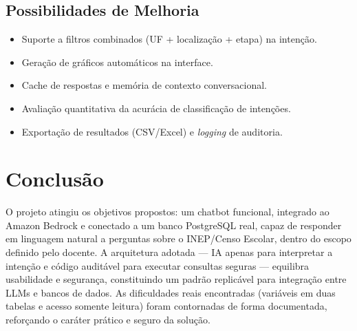 \documentclass[
    12pt,
    oneside,
    a4paper,
    chapter=TITLE,
    section=TITLE
]{abntex2}
\begin{document}
\section{Possibilidades de Melhoria}
\begin{itemize}[itemsep=1pt]
  \item Suporte a filtros combinados (UF + localização + etapa) na intenção.
  \item Geração de gráficos automáticos na interface.
  \item Cache de respostas e memória de contexto conversacional.
  \item Avaliação quantitativa da acurácia de classificação de intenções.
  \item Exportação de resultados (CSV/Excel) e \textit{logging} de auditoria.
\end{itemize}

\chapter{Conclusão}

O projeto atingiu os objetivos propostos: um chatbot funcional, integrado ao Amazon Bedrock e
conectado a um banco PostgreSQL real, capaz de responder em linguagem natural a perguntas sobre o
INEP/Censo Escolar, dentro do escopo definido pelo docente. A arquitetura adotada --- IA apenas para
interpretar a intenção e código auditável para executar consultas seguras --- equilibra usabilidade
e segurança, constituindo um padrão replicável para integração entre LLMs e bancos de dados. As
dificuldades reais encontradas (variáveis em duas tabelas e acesso somente leitura) foram
contornadas de forma documentada, reforçando o caráter prático e seguro da solução.

\postextual

\end{document}
